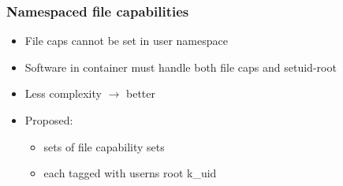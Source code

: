 \documentclass{beamer}
\begin{document}
\begin{frame}
\frametitle{Namespaced file capabilities}
  \begin{itemize}
  \item File caps cannot be set in user namespace
  \item Software in container must handle both file caps and setuid-root
  \item Less complexity $\rightarrow$ better
  \item Proposed:
    \begin{itemize}
    \item sets of file capability sets
    \item each tagged with userns root k\_uid
    \end{itemize}
  \end{itemize}

\end{frame}


\end{document}

